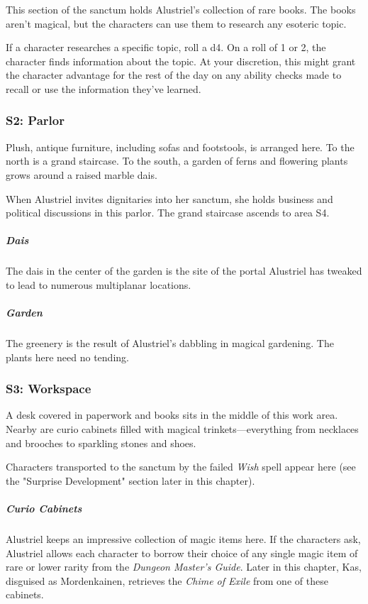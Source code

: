 \documentclass[10pt,a4paper,twoside,bg=print,twocolumn,openany,nodeprecatedcode]{dndbook}
\begin{document}
This section of the sanctum holds Alustriel's collection of rare books. The books aren't magical, but the characters can use them to research any esoteric topic.

If a character researches a specific topic, roll a d4. On a roll of 1 or 2, the character finds information about the topic. At your discretion, this might grant the character advantage for the rest of the day on any ability checks made to recall or use the information they've learned.

\subsubsection{S2: Parlor}
\begin{DndReadAloud}{}
Plush, antique furniture, including sofas and footstools, is arranged here. To the north is a grand staircase. To the south, a garden of ferns and flowering plants grows around a raised marble dais.

\end{DndReadAloud}

When Alustriel invites dignitaries into her sanctum, she holds business and political discussions in this parlor. The grand staircase ascends to area S4.

\subparagraph{Dais}
The dais in the center of the garden is the site of the portal Alustriel has tweaked to lead to numerous multiplanar locations.

\subparagraph{Garden}
The greenery is the result of Alustriel's dabbling in magical gardening. The plants here need no tending.

\subsubsection{S3: Workspace}
\begin{DndReadAloud}{}
A desk covered in paperwork and books sits in the middle of this work area. Nearby are curio cabinets filled with magical trinkets—everything from necklaces and brooches to sparkling stones and shoes.

\end{DndReadAloud}

Characters transported to the sanctum by the failed \textit{Wish} spell appear here (see the "Surprise Development" section later in this chapter).

\subparagraph{Curio Cabinets}
Alustriel keeps an impressive collection of magic items here. If the characters ask, Alustriel allows each character to borrow their choice of any single magic item of rare or lower rarity from the \textit{Dungeon Master's Guide}. Later in this chapter, Kas, disguised as Mordenkainen, retrieves the \textit{Chime of Exile} from one of these cabinets.
\end{document}
